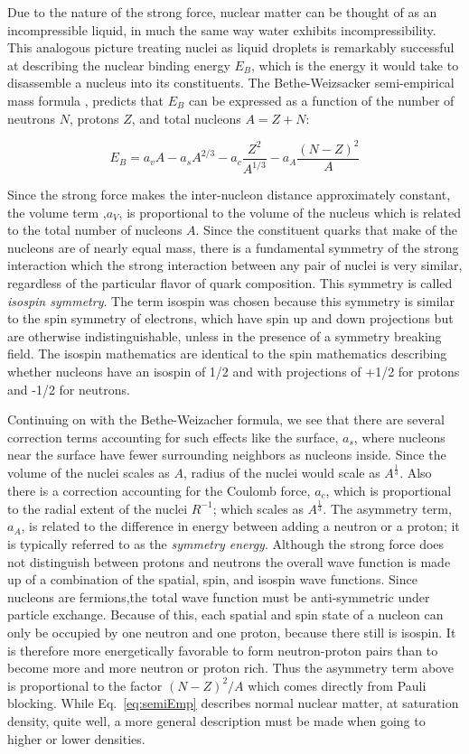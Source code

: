Due to the nature of the strong force, nuclear matter can be thought of as an incompressible liquid, in much the same way water exhibits incompressibility. This analogous picture treating nuclei as liquid droplets is remarkably successful at describing the nuclear binding energy $E_{B}$, which is the energy it would take to disassemble a nucleus into its constituents. The Bethe-Weizsacker semi-empirical mass formula \cite{awayforward}, predicts that $E_{B}$ can be expressed as a function of the number of neutrons $N$, protons $Z$, and total nucleons $A = Z + N$:
 
\begin{equation}
E_{B} = a_vA - a_s A^{2/3} - a_c \frac{Z^2}{A^{1/3}} - a_A \frac{(N - Z)^2}{A}
\label{eq:semiEmp}
\end{equation}

Since the strong force makes the inter-nucleon distance approximately constant, the volume term ,$a_V$, is proportional to the volume of the nucleus which is related to the total number of nucleons $A$. Since the  constituent quarks that make of the nucleons are of nearly equal mass, there is a fundamental symmetry of the strong interaction which the strong interaction between any pair of nuclei is very similar, regardless of the particular flavor of quark composition. This symmetry is called \emph{isospin symmetry}. The term isospin was chosen because this symmetry is similar to the spin symmetry of electrons, which have spin up and down projections but are otherwise indistinguishable, unless in the presence of a symmetry breaking field.  The isospin mathematics are identical to the spin mathematics describing whether nucleons have an isospin of 1/2 and with projections of  +1/2 for protons and -1/2 for neutrons. 

Continuing on with the Bethe-Weizacher formula, we see that there are several correction terms accounting for such effects like the surface, $a_s$, where nucleons near the surface have fewer surrounding neighbors as nucleons inside. Since the volume of the nuclei scales as $A$, radius of the nuclei would scale as $A^{\frac{1}{3}}$. Also there is a correction accounting for the Coulomb force, $a_c$, which is proportional to the radial extent of the nuclei $R^{-1}$; which scales as $A^{\frac{1}{3}}$. The asymmetry term, $a_A$, is related to the difference in energy between adding a neutron or a proton; it is typically referred to as the \emph{symmetry energy}. Although the strong force does not distinguish between protons and neutrons the overall wave function is made up of a combination of the spatial, spin, and isospin wave functions. Since nucleons are fermions,the total wave function must be anti-symmetric under particle exchange. Because of this, each spatial and spin state of a nucleon can only be occupied by one neutron and one proton, because there still is isospin.  It is therefore more energetically favorable to form neutron-proton pairs than to become more and more neutron or proton rich. Thus the asymmetry term above is proportional to the factor $(N - Z)^2/A$ which comes directly from Pauli blocking. While Eq.~\ref{eq:semiEmp} describes normal nuclear matter, at saturation density, quite well, a more general description must be made when going to higher or lower densities. 


